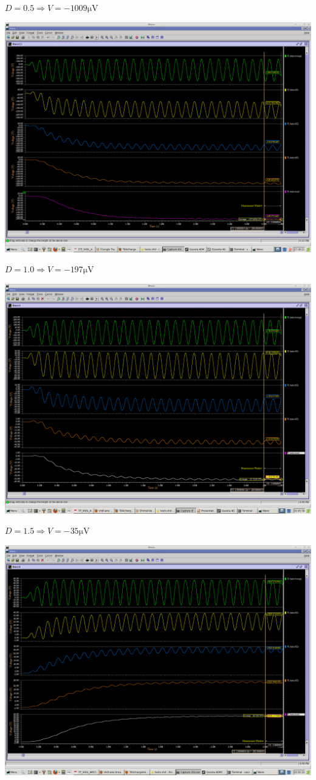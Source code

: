 \documentclass[fleqn]{article}
\begin{document}
$D=0.5\Rightarrow V=-1009\si{\micro\volt}$
\newpage

\includegraphics[width=\linewidth]{1.0.png}

$D=1.0\Rightarrow V=-197\si{\micro\volt}$
\newpage

\includegraphics[width=\linewidth]{1.5.png}

$D=1.5\Rightarrow V=-35\si{\micro\volt}$
\newpage

\includegraphics[width=\linewidth]{2.0.png}
\end{document}
